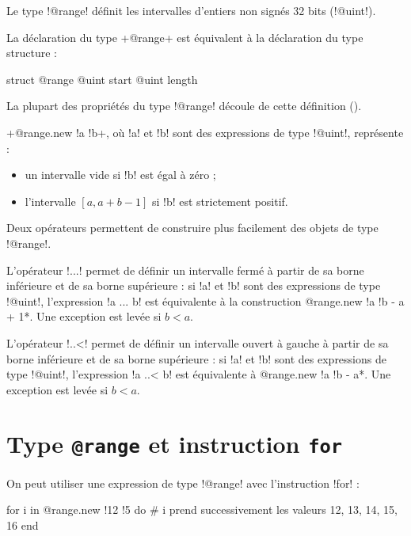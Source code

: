 

Le type \ggs!@range! définit les intervalles d'entiers non signés 32 bits (\ggs!@uint!).

La déclaration du type \ggs+@range+ est équivalent à la déclaration du type structure :
\begin{galgas}
struct @range {
  @uint start
  @uint length
}
\end{galgas}

La plupart des propriétés du type \ggs!@range! découle de cette définition ().

\ggs+@range.new {!a !b}+, où \ggs!a! et \ggs!b! sont des expressions de type \ggs!@uint!, représente :
\begin{itemize}
  \item un intervalle vide si \ggs!b! est égal à zéro ;
  \item l'intervalle $[a, a+b-1]$ si \ggs!b! est strictement positif.
\end{itemize}




Deux opérateurs permettent de construire plus facilement des objets de type \ggs!@range!.

L'opérateur \ggs!...! permet de définir un intervalle fermé à partir de sa borne inférieure et de sa borne supérieure : si \ggs!a! et \ggs!b! sont des expressions de type \ggs!@uint!, l'expression \ggs!a ... b! est équivalente à la construction \ggs*@range.new {!a !b - a + 1}*. Une exception est levée si $b < a$. 

L'opérateur \ggs!..<! permet de définir un intervalle ouvert à gauche à partir de sa borne inférieure et de sa borne supérieure : si \ggs!a! et \ggs!b! sont des expressions de type \ggs!@uint!, l'expression \ggs!a ..< b! est équivalente à \ggs*@range.new {!a !b - a}*. Une exception est levée si $b < a$.

\section{Type \texttt{@range} et instruction \texttt{for}}

On peut utiliser une expression de type \ggs!@range! avec l'instruction \ggs!for! :

\begin{galgas}
for i in @range.new {!12 !5} do
  # i prend successivement les valeurs 12, 13, 14, 15, 16
end
\end{galgas}

